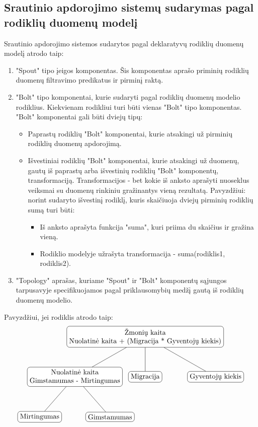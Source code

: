 \documentclass{VUMIFPSbakalaurinis}
\begin{document}
\subsection{Srautinio apdorojimo sistemų sudarymas pagal rodiklių duomenų modelį}
Srautinio apdorojimo sistemos sudarytos pagal deklaratyvų rodiklių duomenų modelį atrodo taip:
\begin{enumerate}
    \item "Spout" tipo įeigos komponentas. Šis komponentas aprašo priminių rodiklių duomenų filtravimo predikatus ir pirminį raktą. 
    \item "Bolt" tipo komponentai, kurie sudaryti pagal rodiklių duomenų modelio rodiklius. Kiekvienam rodikliui turi būti vienas "Bolt" tipo komponentas. "Bolt" komponentai gali būti dviejų tipų:
    \begin{itemize}
        \item Paprastų rodiklių "Bolt" komponentai, kurie atsakingi už pirminių rodiklių duomenų apdorojimą.
        \item Išvestiniai rodiklių "Bolt" komponentai, kurie atsakingi už duomenų, gautų iš paprastų arba išvestinių rodiklių "Bolt" komponentų, transformaciją. Transformacijos - bet kokie iš anksto aprašyti nuoseklus veiksmai su duomenų rinkiniu gražinantys vieną rezultatą. Pavyzdžiui: norint sudaryto išvestinį rodiklį, kuris skaičiuoja dviejų pirminių rodiklių sumą turi būti:
        \begin{itemize}
            \item Iš anksto aprašyta funkcija "suma", kuri priima du skaičius ir gražina vieną.
            \item Rodiklio modelyje užrašyta transformacija - suma(rodiklis1, rodiklis2).
        \end{itemize} 
    \end{itemize}
    \item "Topology" aprašas, kuriame "Spout" ir "Bolt" komponentų sąjungos tarpusavyje specifikuojamos pagal priklausomybių medžį gautą iš rodiklių duomenų modelio.
\end{enumerate}\par
Pavyzdžiui, jei rodiklis atrodo taip:     
\[
    \begin{tikzpicture}[sibling distance=10em,
        level distance=2cm,
        every node/.style = {shape=rectangle, rounded corners,	
                             draw, align=center,	
                             top color=white, bottom color=white}]	
        \node{Žmonių kaita\\Nuolatinė kaita + (Migracija * Gyventojų kiekis)}
                child { node {Nuolatinė kaita\\Gimstamumas - Mirtingumas} 
                        child {node {Mirtingumas}}
                        child {node {Gimstamumas}} }	
                child { node {Migracija} } 	
                child { node {Gyventojų kiekis} }; 	
    \end{tikzpicture} 	
\]\par
\end{document}
